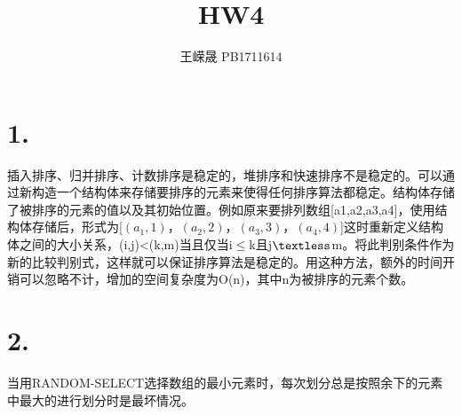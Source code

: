\documentclass[UTF8]{ctexart}
\title{HW4}
\author{王嵘晟 \quad PB1711614}
\date{}
\begin{document}
	\maketitle
	\section*{1.}
    \par{插入排序、归并排序、计数排序是稳定的，堆排序和快速排序不是稳定的。可以通过新构造一个结构体来存储要排序的元素来使得任何排序算法都稳定。结构体存储了被排序的元素的值以及其初始位置。例如原来要排列数组[a1,a2,a3,a4]，使用结构体存储后，形式为[$(a_{1},1)$，$(a_{2},2)$，$(a_{3},3)$，$(a_{4},4)$]这时重新定义结构体之间的大小关系，(i,j)<(k,m)当且仅当i$\le$k且j$\textless$m。将此判别条件作为新的比较判别式，这样就可以保证排序算法是稳定的。用这种方法，额外的时间开销可以忽略不计，增加的空间复杂度为O(n)，其中n为被排序的元素个数。}
    \section*{2.}
    \par{当用RANDOM-SELECT选择数组的最小元素时，每次划分总是按照余下的元素中最大的进行划分时是最坏情况。}\\
    \\
    \\
    \\
    \\
    \\
    \\
    \\
    \\
    \\
\end{document}
